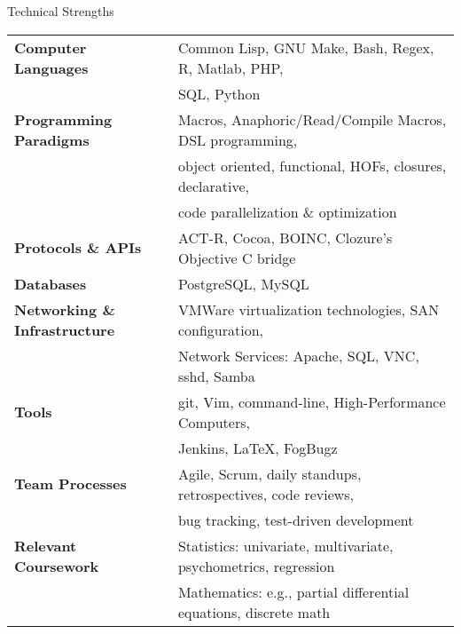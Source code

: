 

\begin{rSection}{Technical Strengths}

\begin{tabular}{ @{} >{\bfseries}l @{\hspace{6ex}} l }
Computer Languages & 		Common Lisp, GNU Make, Bash, Regex, R, Matlab, PHP, \\
& 				SQL, Python \\
Programming Paradigms &		Macros, Anaphoric/Read/Compile Macros, DSL programming, \\
& 				object oriented, functional, HOFs, closures, declarative, \\
&				code parallelization \& optimization \\
Protocols \& APIs & 		ACT-R, Cocoa, BOINC, Clozure's Objective C bridge \\
Databases &			PostgreSQL, MySQL \\
Networking \& Infrastructure &	VMWare virtualization technologies, SAN configuration, \\
&				Network Services: Apache, SQL, VNC, sshd, Samba \\
Tools & 			git, Vim, command-line, High-Performance Computers, \\
&				Jenkins, \LaTeX, FogBugz \\
Team Processes & 		Agile, Scrum, daily standups, retrospectives, code reviews, \\
& 				bug tracking, test-driven development \\
Relevant Coursework &		Statistics: univariate, multivariate, psychometrics, regression \\
&				Mathematics: e.g., partial differential equations, discrete math
\end{tabular}

\end{rSection}

